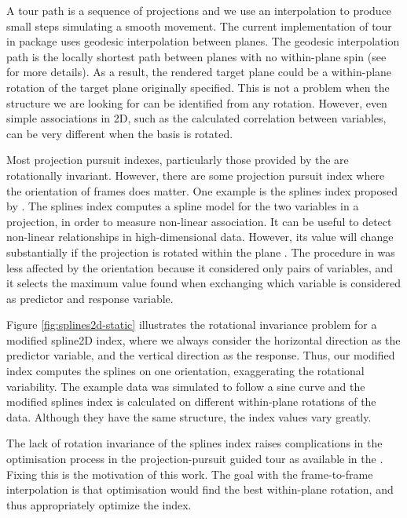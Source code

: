 A tour path is a sequence of projections and we use an interpolation to
produce small steps simulating a smooth movement. The current
implementation of tour in  package uses geodesic
interpolation between planes. The geodesic interpolation path is the
locally shortest path between planes with no within-plane spin (see
\citet{Buja2004TheoryOD} for more details). As a result, the rendered
target plane could be a within-plane rotation of the target plane
originally specified. This is not a problem when the structure we are
looking for can be identified from any rotation. However, even simple
associations in 2D, such as the calculated correlation between
variables, can be very different when the basis is rotated.

Most projection pursuit indexes, particularly those provided by the
 are rotationally invariant. However, there are some
projection pursuit index where the orientation of frames does matter.
One example is the splines index proposed by \citet{Grimm2016}. The
splines index computes a spline model for the two variables in a
projection, in order to measure non-linear association. It can be useful
to detect non-linear relationships in high-dimensional data. However,
its value will change substantially if the projection is rotated within
the plane \citep{pp}. The procedure in \citet{Grimm2016} was less
affected by the orientation because it considered only pairs of
variables, and it selects the maximum value found when exchanging which
variable is considered as predictor and response variable.

Figure \ref{fig:splines2d-static} illustrates the rotational invariance
problem for a modified spline2D index, where we always consider the
horizontal direction as the predictor variable, and the vertical
direction as the response. Thus, our modified index computes the splines
on one orientation, exaggerating the rotational variability. The example
data was simulated to follow a sine curve and the modified splines index
is calculated on different within-plane rotations of the data. Although
they have the same structure, the index values vary greatly.

The lack of rotation invariance of the splines index raises
complications in the optimisation process in the projection-pursuit
guided tour as available in the . Fixing this is the
motivation of this work. The goal with the frame-to-frame interpolation
is that optimisation would find the best within-plane rotation, and thus
appropriately optimize the index.

